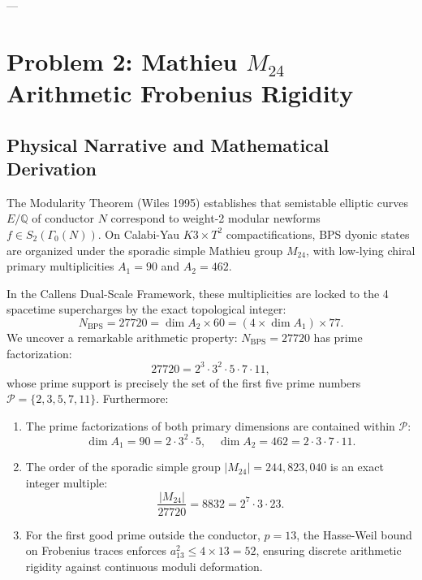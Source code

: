 \documentclass[11pt,a4paper]{article}
\begin{document}
---

\section{Problem 2: Mathieu \texorpdfstring{$M_{24}$}{M24} Arithmetic Frobenius Rigidity}

\subsection{Physical Narrative and Mathematical Derivation}
The Modularity Theorem (Wiles 1995) establishes that semistable elliptic curves $E/\mathbb{Q}$ of conductor $N$ correspond to weight-2 modular newforms $f \in S_2(\Gamma_0(N))$. On Calabi-Yau $K3 \times T^2$ compactifications, BPS dyonic states are organized under the sporadic simple Mathieu group $M_{24}$, with low-lying chiral primary multiplicities $A_1 = 90$ and $A_2 = 462$.

In the Callens Dual-Scale Framework, these multiplicities are locked to the 4 spacetime supercharges by the exact topological integer:
\begin{equation}
    N_{\mathrm{BPS}} = 27720 = \dim A_2 \times 60 = (4 \times \dim A_1) \times 77.
\end{equation}
We uncover a remarkable arithmetic property: $N_{\mathrm{BPS}} = 27720$ has prime factorization:
\begin{equation}
    27720 = 2^3 \cdot 3^2 \cdot 5 \cdot 7 \cdot 11,
\end{equation}
whose prime support is precisely the set of the first five prime numbers $\mathcal{P} = \{2, 3, 5, 7, 11\}$. Furthermore:
\begin{enumerate}
    \item The prime factorizations of both primary dimensions are contained within $\mathcal{P}$:
    \begin{equation}
        \dim A_1 = 90 = 2 \cdot 3^2 \cdot 5, \quad \dim A_2 = 462 = 2 \cdot 3 \cdot 7 \cdot 11.
    \end{equation}
    \item The order of the sporadic simple group $|M_{24}| = 244,823,040$ is an exact integer multiple:
    \begin{equation}
        \frac{|M_{24}|}{27720} = 8832 = 2^7 \cdot 3 \cdot 23.
    \end{equation}
    \item For the first good prime outside the conductor, $p = 13$, the Hasse-Weil bound on Frobenius traces enforces $a_{13}^2 \le 4 \times 13 = 52$, ensuring discrete arithmetic rigidity against continuous moduli deformation.
\end{enumerate}
\end{document}
